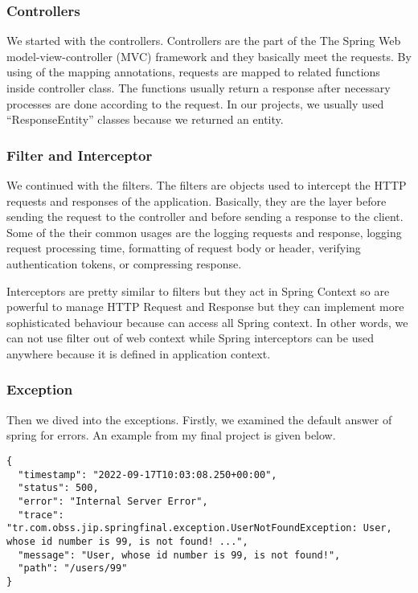 \subsubsection{Controllers}

We started with the controllers. Controllers are the part of the The Spring Web model-view-controller (MVC) framework and they basically meet the requests. By using of the mapping annotations, requests are mapped to related functions inside controller class. The functions usually return a response after necessary processes are done according to the request. In our projects, we usually used ``ResponseEntity'' classes because we returned an entity.

\subsubsection{Filter and Interceptor}

We continued with the filters. The filters are objects used to intercept the HTTP requests and responses of the application. Basically, they are the layer before sending the request to the controller and before sending a response to the client. Some of the their common usages are the logging requests and response, logging request processing time, formatting of request body or header, verifying authentication tokens, or compressing response.

Interceptors are pretty similar to filters but they act in Spring Context so are powerful to manage HTTP Request and Response but they can implement more sophisticated behaviour because can access all Spring context. In other words, we can not use filter out of web context while Spring interceptors can be used anywhere because it is defined in application context.

\subsubsection{Exception}

Then we dived into the exceptions. Firstly, we examined the default answer of spring for errors. An example from my final project is given below. 
\begin{verbatim}
{
  "timestamp": "2022-09-17T10:03:08.250+00:00",
  "status": 500,
  "error": "Internal Server Error",
  "trace": "tr.com.obss.jip.springfinal.exception.UserNotFoundException: User, whose id number is 99, is not found! ...",
  "message": "User, whose id number is 99, is not found!",
  "path": "/users/99"
}
\end{verbatim}

